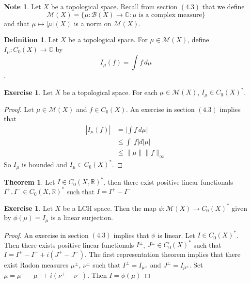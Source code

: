 \documentclass[12pt]{amsart}
\theoremstyle{definition}
\newtheorem{defn}[definition]{Definition}
\newtheorem{note}[definition]{Note}
\newtheorem{thm}[definition]{Theorem}
\newtheorem{ex}[definition]{Exercise}
\newcommand{\C}{\mathbb{C}}
\newcommand{\R}{\mathbb{R}}
\newcommand{\MB}{\mathcal{B}}
\newcommand{\MM}{\mathcal{M}}
\newcommand{\dmu}{\, d \mu}
\newcommand{\lex}[1]{\label{ex:#1}}
\newcommand{\ld}[1]{\label{defn:#1}}
\begin{document}
	\begin{note}
	Let $X$ be a topological space. Recall from section $(4.3)$ that we define $$\MM(X) = \{\mu:\MB(X) \rightarrow \C: \mu \text{ is a complex measure}\}$$ and that $\mu \mapsto |\mu|(X)$ is a norm on $\MM(X)$. 
	\end{note}		
	
	\begin{defn} \ld{00000} 
	Let $X$ be a topological space. For $\mu \in \MM(X)$, define $I_{\mu} :C_0(X) \rightarrow \C$ by $$I_{\mu} (f) = \int f \dmu$$.
	\end{defn}
	
	\begin{ex} \lex{00000} 
	Let $X$ be a topological space. For each $\mu \in \MM(X)$, $I_\mu \in C_0(X)^*$.
	\end{ex}
	
	\begin{proof}
	Let $\mu \in \MM(X)$ and $f \in C_0(X)$. An exercise in section $(4.3)$ implies that 
	\begin{align*}
	|I_{\mu}(f)| 
	&= \bigg| \int f \dmu \bigg| \\
	& \leq \int |f| d |\mu| \\
	& \leq \| \mu \| \|f\|_{\infty}
	\end{align*}
	So $I_{\mu}$ is bounded and $I_{\mu} \in C_0(X)^*$.
	\end{proof}
	
	\begin{thm}
	Let $I \in C_0(X, \R)^*$, then there exist positive linear functionals $I^+, I^- \in C_0(X, \R)^*$ such that $I = I^+ - I^-$
	\end{thm}
	
	\begin{ex} \lex{00000} 
	Let $X$ be a LCH space. Then the map $ \phi: \MM(X) \rightarrow C_0(X)^*$ given by $\phi(\mu) = I_{\mu}$ is a linear surjection.
	\end{ex}
	
	\begin{proof}
	An exercise in section $(4.3)$ implies that $\phi$ is linear. Let $I \in C_0(X)^*$. Then there exists positive linear functionals $I^{\pm}$, $J^{\pm} \in C_0(X)^*$ such that $I = I^+ - I^- + i(J^+ - J^-)$. The first representation theorem implies that there exist Radon measures $\mu^{\pm}$, $\nu^{\pm}$ such that $I^{\pm} = I_{\mu^{\pm}}$ and $J^{\pm} = I_{\mu^{\pm}}$. Set $\mu = \mu^+ - \mu^- +i(\nu^+ - \nu ^-)$. Then $I = \phi(\mu)$
	\end{proof}
	
\end{document}
